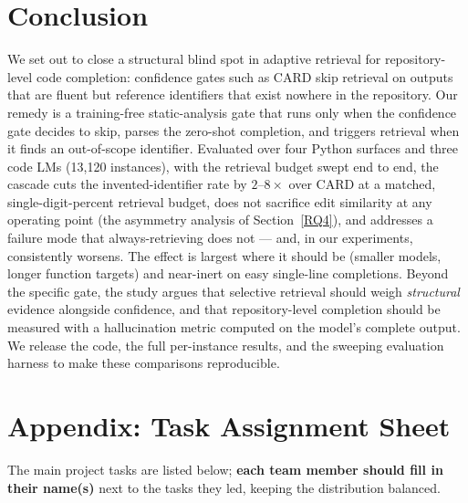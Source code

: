 \documentclass[10pt,conference]{IEEEtran}
\newcommand{\ugr}[1]{{\color{revgreen}#1}}
\begin{document}
\section{Conclusion}
We set out to close a structural blind spot in adaptive retrieval for
repository-level code completion: confidence gates such as CARD skip retrieval on
outputs that are fluent but reference identifiers that exist nowhere in the
repository. Our remedy is a training-free static-analysis gate that runs only when
the confidence gate decides to skip, parses the zero-shot completion, and triggers
retrieval when it finds an out-of-scope identifier. Evaluated over four Python
surfaces and three code LMs (13{,}120 instances), with the retrieval budget swept
end to end, the cascade cuts the invented-identifier rate \ugr{by $2$--$8\times$} over
CARD at a matched, single-digit-percent retrieval budget, \ugr{does not
sacrifice edit similarity at any operating point (the asymmetry analysis of
Section~\ref{RQ4})}, and addresses a
failure mode that always-retrieving does not \ugr{--- and, in our experiments,
consistently worsens}. The effect
is largest where it should be (smaller models, longer function targets) and
near-inert on easy single-line completions. Beyond the specific gate, the study
argues that selective retrieval should weigh \emph{structural} evidence alongside
confidence, and that repository-level completion should be measured with a
hallucination metric computed on the model's complete output. We release the code,
the full per-instance results, and the sweeping evaluation harness to make these
comparisons reproducible.








\newpage
\section{Appendix: Task Assignment Sheet}
\noindent The main project tasks are listed below; \textbf{each team member should
fill in their name(s)} next to the tasks they led, keeping the distribution
balanced.
\vspace{4pt}
\end{document}
